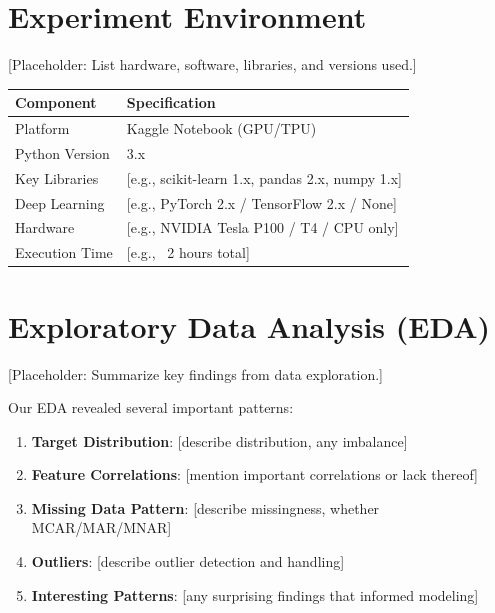 \documentclass{article}
\begin{document}
\section{Experiment Environment}

 [Placeholder: List hardware, software, libraries, and versions used.]

\begin{tabular}{ll}
    \toprule
    \textbf{Component} & \textbf{Specification}                          \\
    \midrule
    Platform           & Kaggle Notebook (GPU/TPU)                       \\
    Python Version     & 3.x                                             \\
    Key Libraries      & [e.g., scikit-learn 1.x, pandas 2.x, numpy 1.x] \\
    Deep Learning      & [e.g., PyTorch 2.x / TensorFlow 2.x / None]     \\
    Hardware           & [e.g., NVIDIA Tesla P100 / T4 / CPU only]       \\
    Execution Time     & [e.g., ~2 hours total]                          \\
    \bottomrule
\end{tabular}

\section{Exploratory Data Analysis (EDA)}

 [Placeholder: Summarize key findings from data exploration.]

Our EDA revealed several important patterns:

\begin{enumerate}
    \item \textbf{Target Distribution}: [describe distribution, any imbalance]
    \item \textbf{Feature Correlations}: [mention important correlations or lack thereof]
    \item \textbf{Missing Data Pattern}: [describe missingness, whether MCAR/MAR/MNAR]
    \item \textbf{Outliers}: [describe outlier detection and handling]
    \item \textbf{Interesting Patterns}: [any surprising findings that informed modeling]
\end{enumerate}
\end{document}
